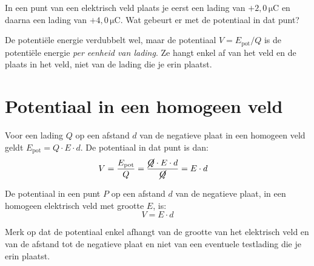 \documentclass{ximera}
\begin{document}
\begin{question}
    In een punt van een elektrisch veld plaats je eerst een lading van $+2{,}0 \, \mathrm{\mu C}$ en daarna een lading van $+4{,}0 \, \mathrm{\mu C}$. Wat gebeurt er met de potentiaal in dat punt?

    \begin{multipleChoice}
    \end{multipleChoice}

    \begin{solution}\nl
        De potentiële energie verdubbelt wel, maar de potentiaal $V = E_{\text{pot}}/Q$ is de potentiële energie \emph{per eenheid van lading}. Ze hangt enkel af van het veld en de plaats in het veld, niet van de lading die je erin plaatst.
    \end{solution}
\end{question}

\section{Potentiaal in een homogeen veld}
Voor een lading $Q$ op een afstand $d$ van de negatieve plaat in een homogeen veld geldt $E_{\text{pot}} = Q \cdot E \cdot d$. De potentiaal in dat punt is dan:
\begin{align*}
    V &= \frac{E_{\text{pot}}}{Q} = \frac{\cancel{Q} \cdot E \cdot d}{\cancel{Q}} = E \cdot d
\end{align*}

\begin{proposition}[foldable=true,title={Potentiaal in een homogeen veld}]\nl
De potentiaal in een punt $P$ op een afstand $d$ van de negatieve plaat, in een homogeen elektrisch veld met grootte $E$, is:
\begin{equation}\label{eq:potentiaal_homogeen}
    V = E \cdot d
\end{equation}
\end{proposition}

Merk op dat de potentiaal enkel afhangt van de grootte van het elektrisch veld en van de afstand tot de negatieve plaat en niet van een eventuele testlading die je erin plaatst.
\end{document}

